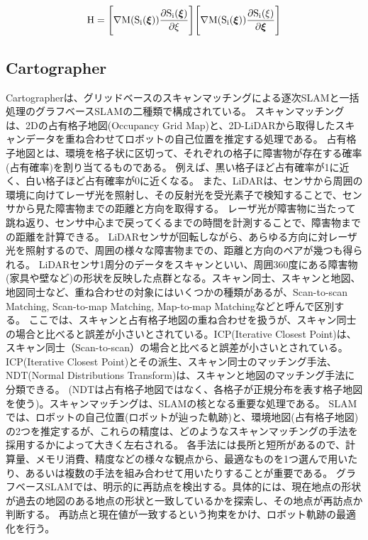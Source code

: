 \begin{align}
  \rm{H} = \Biggl[\nabla M(S_i(\bm{\xi}))\frac{\partial\rm{S}_i(\bm{\xi})}{\partial\xi}\Biggr]\Biggl[\nabla M(S_i(\bm{\xi}))\frac{\partial\bm{S}_i(\xi)}{\partial\bm{\xi}}\Biggr] \label{slam:eq:hesse}
\end{align}

\subsection{Cartographer}
Cartographerは、グリッドベースのスキャンマッチングによる逐次SLAMと一括処理のグラフベースSLAMの二種類で構成されている。
スキャンマッチングは、2Dの占有格子地図(Occupancy Grid Map)と、2D-LiDARから取得したスキャンデータを重ね合わせてロボットの自己位置を推定する処理である。
占有格子地図とは、環境を格子状に区切って、それぞれの格子に障害物が存在する確率(占有確率)を割り当てるものである。
例えば、黒い格子ほど占有確率が1に近く、白い格子ほど占有確率が0に近くなる。
また、LiDARは、センサから周囲の環境に向けてレーザ光を照射し、その反射光を受光素子で検知することで、センサから見た障害物までの距離と方向を取得する。
レーザ光が障害物に当たって跳ね返り、センサ中心まで戻ってくるまでの時間を計測することで、障害物までの距離を計算できる。
LiDARセンサが回転しながら、あらゆる方向に対レーザ光を照射するので、周囲の様々な障害物までの、距離と方向のペアが幾つも得られる。
LiDARセンサ1周分のデータをスキャンといい、周囲360度にある障害物(家具や壁など)の形状を反映した点群となる。スキャン同士、スキャンと地図、地図同士など、重ね合わせの対象にはいくつかの種類があるが、Scan-to-scan Matching, Scan-to-map Matching, Map-to-map Matchingなどと呼んで区別する。
ここでは、スキャンと占有格子地図の重ね合わせを扱うが、スキャン同士の場合と比べると誤差が小さいとされている。ICP(Iterative Closest Point)は、スキャン同士（Scan-to-scan）の場合と比べると誤差が小さいとされている。
ICP(Iterative Closest Point)とその派生、スキャン同士のマッチング手法、NDT(Normal Distributions Transform)は、スキャンと地図のマッチング手法に分類できる。
(NDTは占有格子地図ではなく、各格子が正規分布を表す格子地図を使う)。スキャンマッチングは、SLAMの核となる重要な処理である。
SLAMでは、ロボットの自己位置(ロボットが辿った軌跡)と、環境地図(占有格子地図)の2つを推定するが、これらの精度は、どのようなスキャンマッチングの手法を採用するかによって大きく左右される。
各手法には長所と短所があるので、計算量、メモリ消費、精度などの様々な観点から、最適なものを1つ選んで用いたり、あるいは複数の手法を組み合わせて用いたりすることが重要である。
グラフベースSLAMでは、明示的に再訪点を検出する。具体的には、現在地点の形状が過去の地図のある地点の形状と一致しているかを探索し、その地点が再訪点か判断する。
再訪点と現在値が一致するという拘束をかけ、ロボット軌跡の最適化を行う。

